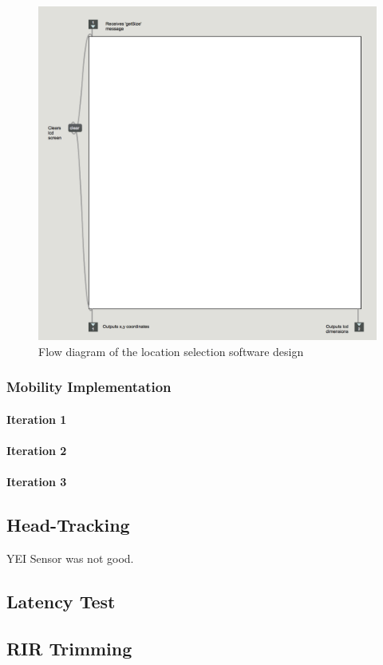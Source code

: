 \documentclass[../../main.tex]{subfiles}
\begin{document}
			\begin{figure}[H]
				\centerline{\includegraphics[scale = 0.4]{Sections/Implementation/Max/images/Max/lcd.png}}
				\caption{Flow diagram of the location selection software design}
				\label{lcd}
			\end{figure}


		\subsubsection{Mobility Implementation}

		 \paragraph{Iteration 1}


		 \paragraph{Iteration 2}

		 \paragraph{Iteration 3}



	\subsection{Head-Tracking}
		YEI Sensor was not good.


	\subsection{Latency Test}
	
	\subsection{RIR Trimming}
\end{document}
